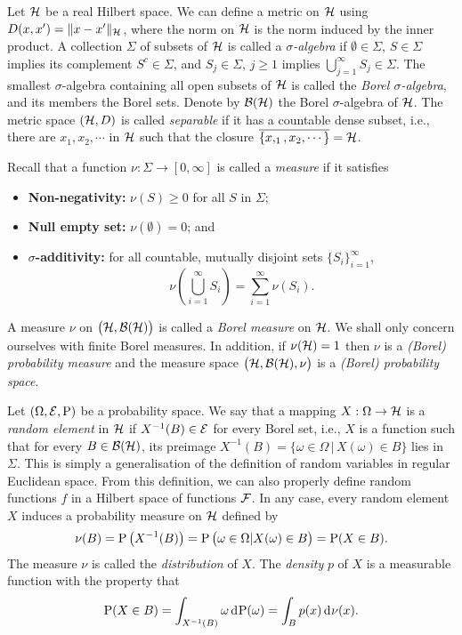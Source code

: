 
Let ${\mathcal H}$ be a real Hilbert space. 
We can define a metric on ${\mathcal H}$ using $D(x,x') = \lVert x-x'\rVert_{\mathcal H}$, where the norm on ${\mathcal H}$ is the norm induced by the inner product.
A collection $\Sigma$ of subsets of ${\mathcal H}$ is called a \emph{$\sigma$-algebra} if $\emptyset \in \Sigma$, $S \in \Sigma$ implies its complement $S^c \in \Sigma$, and $S_j\in\Sigma$, $j\geq 1$ implies $\bigcup_{j=1}^\infty S_j \in \Sigma$.
The smallest $\sigma$-algebra containing all open subsets of ${\mathcal H}$ is called the \emph{Borel $\sigma$-algebra}, and its members the Borel sets.
Denote by ${\mathcal B}({\mathcal H})$ the Borel $\sigma$-algebra of ${\mathcal H}$.
The metric space $({\mathcal H},D)$ is called \emph{separable} if it has a countable dense subset, i.e., there are $x_1,x_2,\cdots$ in ${\mathcal H}$ such that the closure $\overline{\{x,_1,x_2,\cdots\}} = {\mathcal H}$.

Recall that a function $\nu:\Sigma\to[0,\infty]$ is called a \emph{measure} if it satisfies
\begin{itemize}
  \item \textbf{Non-negativity:} $\nu(S) \geq 0$ for all $S$ in $\Sigma$;
  \item \textbf{Null empty set:} $\nu(\emptyset) = 0$; and
  \item \textbf{$\sigma$-additivity:} for all countable, mutually disjoint sets $\{S_i\}_{i=1}^\infty$,
  \[
    \nu\left(\bigcup_{i=1}^\infty S_i \right) = \sum_{i=1}^\infty \nu(S_i).
  \] 
\end{itemize}
A measure $\nu$ on $\big({\mathcal H},{\mathcal B}({\mathcal H})\big)$ is called a \emph{Borel measure} on ${\mathcal H}$.
We shall only concern ourselves with finite Borel measures. 
In addition, if $\nu({\mathcal H}) = 1$ then $\nu$ is a \emph{(Borel) probability measure} and the measure space $\big({\mathcal H},{\mathcal B}({\mathcal H}),\nu\big)$ is a \emph{(Borel) probability space}.

Let $(\Omega,{\mathcal E},\operatorname{P})$ be a probability space.
We say that a mapping $X:\Omega\to{\mathcal H}$ is a \emph{random element} in ${\mathcal H}$ if $X^{-1}(B)\in{\mathcal E}$ for every Borel set, i.e., $X$ is a function such that for every $B\in{\mathcal B}({\mathcal H})$, its preimage $X^{-1}(B) = \{\omega \in \Omega \,|\, X(\omega) \in B \}$ lies in $\Sigma$.
This is simply a generalisation of the definition of random variables in regular Euclidean space.
From this definition, we can also properly define random functions $f$ in a Hilbert space of functions ${\mathcal F}$.
In any case, every random element $X$ induces a probability measure on ${\mathcal H}$ defined by
\[
  \nu(B) = \operatorname{P}\big(X^{-1}(B)\big) = \operatorname{P}\big( \omega \in \Omega | X(\omega) \in B  \big) = \operatorname{P}(X \in B).
\]
The measure $\nu$ is called the \emph{distribution} of $X$.
The \emph{density} $p$ of $X$ is a measurable function with the property that
\[
  \operatorname{P}(X \in B) = \int_{X^{-1}(B)} \omega \operatorname{d}\hspace{0.5pt}\!\operatorname{P}(\omega) = \int_B p(x) \operatorname{d}\hspace{0.5pt}\!\nu(x).
\]

